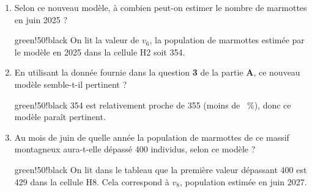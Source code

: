 \begin{enumerate}
\begin{center}
\tabcolwidth{1cm} %
\end{center}	

		\begin{enumerate}
			\item Selon ce nouveau modèle, à combien peut-on estimer le nombre de marmottes en juin 2025 ?
			
			\begin{color}{green!50!black}
			On lit la valeur de $v_{6}$, la population de marmottes estimée par le modèle en 2025 dans la cellule {\helvbx H2} soit 354.
			\end{color}
			
			\item En utilisant la donnée fournie dans la question \textbf{3} de la partie \textbf{A}, ce nouveau modèle semble-t-il pertinent ?
			
			\begin{color}{green!50!black}
			354 est relativement proche de 355 (moins de ~\%), donc ce modèle paraît pertinent.
			\end{color}
			
			\item Au mois de juin de quelle année la population de marmottes de ce massif montagneux aura-t-elle dépassé 400 individus, selon ce modèle ?
			
			\begin{color}{green!50!black}
			On lit dans le tableau que la première valeur dépassant 400 est 429 dans la cellule {\helvbx H8}. Cela correspond à $v_8$, population estimée en juin 2027.
			\end{color}
			
			
		\end{enumerate}
	\end{enumerate}
